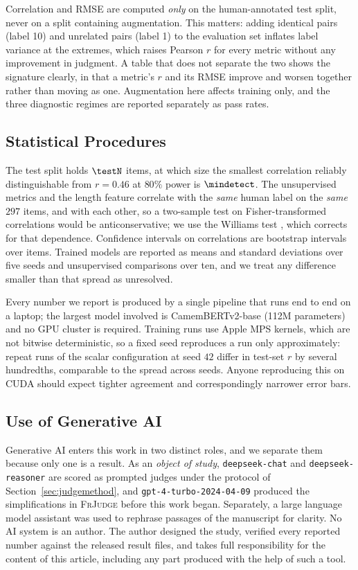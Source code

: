 \documentclass{BVP_JCLLT}
\begin{document}
Correlation and RMSE are computed \emph{only} on the human-annotated test split,
never on a split containing augmentation. This matters: adding identical pairs
(label 10) and unrelated pairs (label 1) to the evaluation set inflates label
variance at the extremes, which raises Pearson $r$ for every metric without any
improvement in judgment. A table that does not separate the two shows the
signature clearly, in that a metric's $r$ and its RMSE improve and worsen
together rather than moving as one. Augmentation here affects training only, and
the three diagnostic regimes are reported separately as pass rates.

\subsection{Statistical Procedures}\label{sec:stats}

The test split holds $\testN$ items, at which size the smallest correlation
reliably distinguishable from $r=0.46$ at $80\%$ power is $\mindetect$. The
unsupervised metrics and the length feature correlate with the \emph{same} human
label on the \emph{same} $297$ items, and with each other, so a two-sample test
on Fisher-transformed correlations would be anticonservative; we use the
Williams test \cite{graham2014williams}, which corrects for that dependence.
Confidence intervals on correlations are bootstrap intervals over items.
Trained models are reported as means and standard deviations over five seeds and
unsupervised comparisons over ten, and we treat any difference smaller than that
spread as unresolved.

Every number we report is produced by a single pipeline that runs end to end on
a laptop; the largest model involved is CamemBERTv2-base (112M parameters) and
no GPU cluster is required. Training runs use Apple MPS kernels, which are not
bitwise deterministic, so a fixed seed reproduces a run only approximately:
repeat runs of the scalar configuration at seed $42$ differ in test-set $r$ by
several hundredths, comparable to the spread across seeds. Anyone reproducing
this on CUDA should expect tighter agreement and correspondingly narrower error
bars.

\subsection{Use of Generative AI}\label{sec:aidisclosure}

Generative AI enters this work in two distinct roles, and we separate them
because only one is a result. As an \emph{object of study},
\texttt{deepseek-chat} and \texttt{deepseek-reasoner} are scored as prompted
judges under the protocol of Section~\ref{sec:judgemethod}, and
\texttt{gpt-4-turbo-2024-04-09} produced the simplifications in \textsc{FrJudge}
before this work began. Separately, a large language model assistant was used to
rephrase passages of the manuscript for clarity. No AI system is an author. The
author designed the study, verified every reported number against the released
result files, and takes full responsibility for the content of this article,
including any part produced with the help of such a tool.
\end{document}
